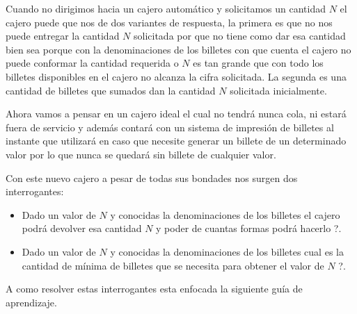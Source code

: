 Cuando no dirigimos hacia un cajero automático y solicitamos un cantidad $N$ el cajero puede que nos de dos variantes de respuesta, la primera es que no nos puede entregar la cantidad $N$ solicitada por que no tiene como dar esa cantidad bien sea porque con la denominaciones de los billetes con que cuenta el cajero no puede conformar la cantidad requerida o $N$ es tan grande que con todo los billetes disponibles en el cajero no alcanza la cifra solicitada. La segunda es una cantidad de billetes que sumados dan la cantidad $N$ solicitada inicialmente.

Ahora vamos a pensar en un cajero ideal el cual no tendrá nunca cola, ni estará fuera de servicio y además contará con un sistema de impresión de billetes al instante que utilizará en caso que necesite generar un billete de un determinado valor por lo que nunca se quedará sin billete de cualquier valor.

Con este nuevo cajero a pesar de todas sus bondades nos surgen dos interrogantes:

\begin{itemize}
	\item Dado un valor de $N$ y conocidas la denominaciones de los billetes el cajero podrá devolver esa cantidad $N$ y poder de cuantas formas podrá hacerlo ?.
	\item Dado un valor de $N$ y conocidas la denominaciones de los billetes cual es la cantidad de mínima de billetes que se necesita para obtener el valor de $N$ ?. 
\end{itemize} 

A como resolver estas interrogantes esta enfocada la siguiente guía de aprendizaje.